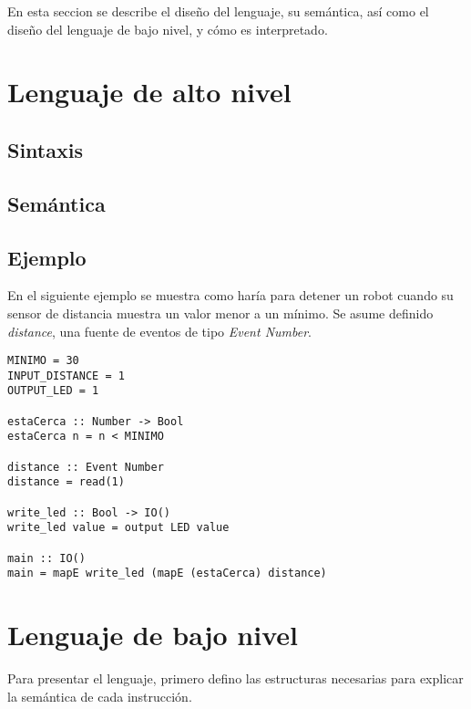 En esta seccion se describe el diseño del lenguaje, su semántica,
así como el diseño del lenguaje de bajo nivel, y cómo es interpretado.

\section{Lenguaje de alto nivel}

\subsection{Sintaxis}

\subsection{Semántica}


\subsection{Ejemplo}

En el siguiente ejemplo se muestra como haría para detener un
robot cuando su sensor de distancia muestra un valor menor a un mínimo.
Se asume definido \emph{distance},
una fuente de eventos de tipo \emph{Event Number}.

\begin{verbatim}
MINIMO = 30
INPUT_DISTANCE = 1
OUTPUT_LED = 1

estaCerca :: Number -> Bool
estaCerca n = n < MINIMO

distance :: Event Number
distance = read(1)

write_led :: Bool -> IO()
write_led value = output LED value

main :: IO()
main = mapE write_led (mapE (estaCerca) distance)

\end{verbatim}

\section{Lenguaje de bajo nivel}

 Para presentar el lenguaje, primero defino las estructuras
necesarias para explicar la semántica de cada instrucción.


